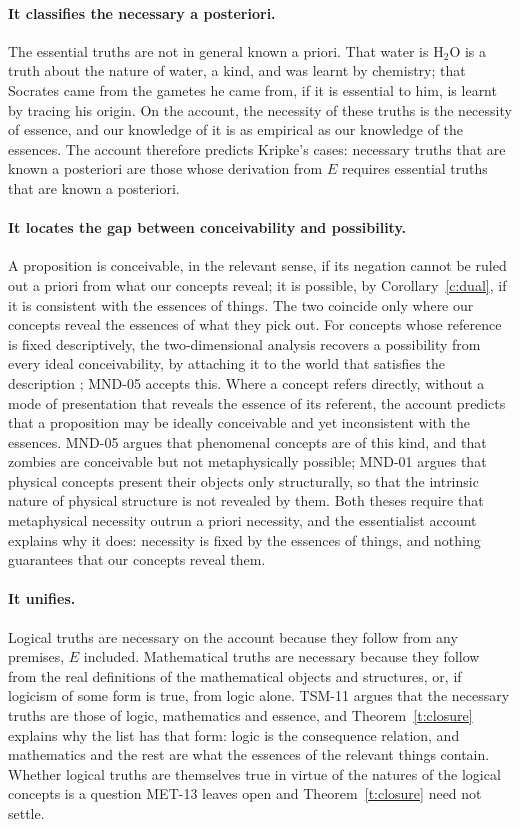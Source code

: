 \documentclass{situationist-preprint}
\begin{document}
\paragraph{It classifies the necessary a posteriori.} The essential truths are not in general known a priori. That water is H$_2$O is a truth about the nature of water, a kind, and was learnt by chemistry; that Socrates came from the gametes he came from, if it is essential to him, is learnt by tracing his origin. On the account, the necessity of these truths is the necessity of essence, and our knowledge of it is as empirical as our knowledge of the essences. The account therefore predicts Kripke's cases: necessary truths that are known a posteriori are those whose derivation from $E$ requires essential truths that are known a posteriori.

\paragraph{It locates the gap between conceivability and possibility.} A proposition is conceivable, in the relevant sense, if its negation cannot be ruled out a priori from what our concepts reveal; it is possible, by Corollary~\ref{c:dual}, if it is consistent with the essences of things. The two coincide only where our concepts reveal the essences of what they pick out. For concepts whose reference is fixed descriptively, the two-dimensional analysis recovers a possibility from every ideal conceivability, by attaching it to the world that satisfies the description \citep{Chalmers2002}; MND-05 accepts this. Where a concept refers directly, without a mode of presentation that reveals the essence of its referent, the account predicts that a proposition may be ideally conceivable and yet inconsistent with the essences. MND-05 argues that phenomenal concepts are of this kind, and that zombies are conceivable but not metaphysically possible; MND-01 argues that physical concepts present their objects only structurally, so that the intrinsic nature of physical structure is not revealed by them. Both theses require that metaphysical necessity outrun a priori necessity, and the essentialist account explains why it does: necessity is fixed by the essences of things, and nothing guarantees that our concepts reveal them.

\paragraph{It unifies.} Logical truths are necessary on the account because they follow from any premises, $E$ included. Mathematical truths are necessary because they follow from the real definitions of the mathematical objects and structures, or, if logicism of some form is true, from logic alone. TSM-11 argues that the necessary truths are those of logic, mathematics and essence, and Theorem~\ref{t:closure} explains why the list has that form: logic is the consequence relation, and mathematics and the rest are what the essences of the relevant things contain. Whether logical truths are themselves true in virtue of the natures of the logical concepts \citep{Fine1994} is a question MET-13 leaves open and Theorem~\ref{t:closure} need not settle.
\end{document}
